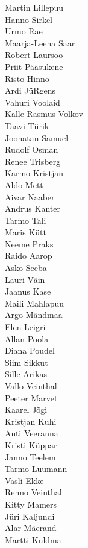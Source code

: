 \begin{multicols}{2}
Martin Lillepuu\\
Hanno Sirkel\\
Urmo Rae\\
Maarja-Leena Saar\\
Robert Laursoo\\
Priit Pääsukene \\
Risto Hinno\\
Ardi JüRgens\\
Vahuri Voolaid\\
Kalle-Rasmus Volkov\\
Taavi Tiirik\\
Joonatan Samuel\\
 Rudolf Osman\\
Renee Trisberg\\
Karmo Kristjan\\
Aldo Mett\\
Aivar Naaber\\
Andrus Kanter\\
Tarmo Tali\\
Maris Kütt \\
Neeme Praks\\
Raido Aarop\\
Asko Seeba\\
Lauri Väin\\
Jaanus Kase\\
Maili Mahlapuu\\
Argo Mändmaa\\
Elen Leigri\\
Allan Poola\\
Diana Poudel\\
Siim Sikkut\\
Sille Arikas\\
Vallo Veinthal\\
Peeter Marvet\\
Kaarel Jõgi\\
Kristjan Kuhi\\
Anti Veeranna\\
Kristi Küppar\\
Janno Teelem\\
Tarmo Luumann\\
Vasli Ekke\\
Renno Veinthal\\
Kitty Mamers\\
Jüri Kaljundi\\
Alar Mäerand\\
Martti Kuldma\\

\end{multicols}
